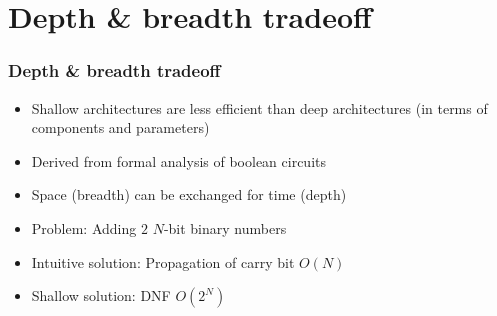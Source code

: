 \section{Depth \& breadth tradeoff}

\begin{frame}
	\frametitle{Depth \& breadth tradeoff}
	\begin{itemize}
		\item Shallow architectures are less efficient than deep architectures (in terms of components and parameters)
		\item Derived from formal analysis of boolean circuits \cite{Hastad87}
		\item Space (breadth) can be exchanged for time (depth)
	\end{itemize}
	
	\begin{example}
		\begin{itemize}
			\item Problem: Adding $2$ $N$-bit binary numbers
			\item Intuitive solution: Propagation of carry bit $O(N)$
			\item Shallow solution: DNF $O(2^N)$
		\end{itemize}
	\end{example}
\end{frame}

